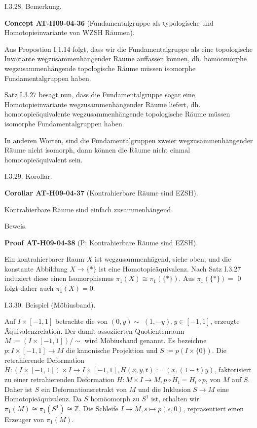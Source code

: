 \documentclass[10pt, letterpaper]{article}
\newcommand{\CustomHeading}[3]{%
  \par\medskip\noindent%
  \textbf{#1 #2} \textnormal{(#3)}.\enskip%
}
\newenvironment{KORO}[2]{\begin{unitbox}\CustomHeading{Corollar}{#1}{#2}}{\end{unitbox}}
\newenvironment{CONC}[2]{\begin{unitbox}\CustomHeading{Concept}{#1}{#2}}{\end{unitbox}}
\newenvironment{PROOF}[2]{\begin{unitbox}\CustomHeading{Proof}{#1}{#2}}{\end{unitbox}}
\begin{document}
I.3.28. Bemerkung. 


\begin{CONC}{AT-H09-04-36}{Fundamentalgruppe als typologische und Homotopieinvariante von WZSH Räumen}
Aus Propostion I.1.14 folgt, dass wir die Fundamentalgruppe als eine topologische Invariante wegzusammenhängender Räume auffassen können, dh. homöomorphe wegzusammenhängende topologische Räume müssen isomorphe Fundamentalgruppen haben. 

Satz I.3.27 besagt nun, dass die Fundamentalgruppe sogar eine Homotopieinvariante wegzusammenhängender Räume liefert, dh. homotopieäquivalente wegzusammenhängende topologische Räume müssen isomorphe Fundamentalgruppen haben. 

In anderen Worten, sind die Fundamentalgruppen zweier wegzusammenhängender Räume nicht isomorph, dann können die Räume nicht einmal homotopieäquivalent sein.
\end{CONC}


I.3.29. Korollar. 


\begin{KORO}{AT-H09-04-37}{Kontrahierbare Räume sind EZSH}
Kontrahierbare Räume sind einfach zusammenhängend.
\end{KORO}

Beweis. 

\begin{PROOF}{AT-H09-04-38}{P: Kontrahierbare Räume sind EZSH}
Ein kontrahierbarer Raum $X$ ist wegzusammenhägend, siehe oben, und die konstante Abbildung $X \rightarrow\{*\}$ ist eine Homotopieäquivalenz. Nach Satz I.3.27 induziert diese einen Isomorphismus $\pi_{1}(X) \cong \pi_{1}(\{*\})$. Aus $\pi_{1}(\{*\})=$ 0 folgt daher auch $\pi_{1}(X)=0$.
\end{PROOF}



I.3.30. Beispiel (Möbiusband). 

Auf $I \times[-1,1]$ betrachte die von $(0, y) \sim$ $(1,-y), y \in[-1,1]$, erzeugte Äquivalenzrelation. Der damit assoziierten Quotientenraum $M:=(I \times[-1,1]) / \sim$ wird Möbiusband genannt. Es bezeichne $p: I \times[-1,1] \rightarrow M$ die kanonische Projektion und $S:=p(I \times\{0\})$. Die retrahierende Deformation $\tilde{H}:(I \times[-1,1]) \times I \rightarrow I \times[-1,1], \tilde{H}(x, y, t):=(x,(1-t) y)$, faktorisiert zu einer retrahierenden Deformation $H: M \times I \rightarrow M, p \circ \tilde{H}_{t}=H_{t} \circ p$, von $M$ auf $S$. Daher ist $S$ ein Deformationsretrakt von $M$ und die Inklusion $S \rightarrow M$ eine Homotopieäquivalenz. Da $S$ homöomorph zu $S^{1}$ ist, erhalten wir $\pi_{1}(M) \cong \pi_{1}\left(S^{1}\right) \cong \mathbb{Z}$. Die Schleife $I \rightarrow M, s \mapsto p(s, 0)$, repräsentiert einen Erzeuger von $\pi_{1}(M)$.
\end{document}
